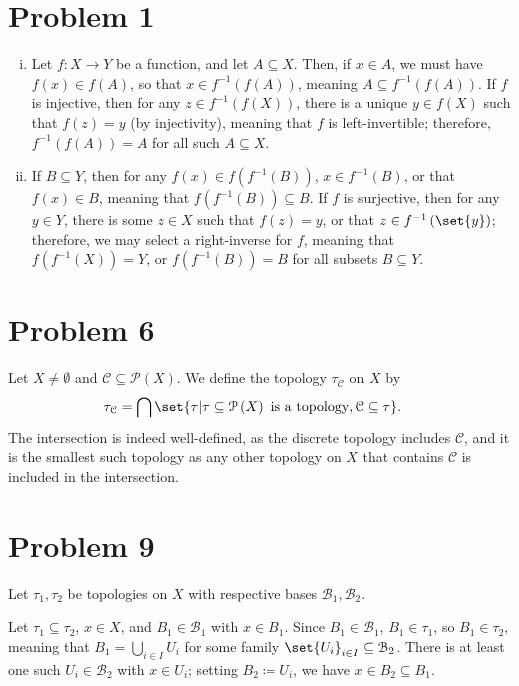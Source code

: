 \documentclass[10pt]{mypackage}
\begin{document}
\RaggedRight
\section{Problem 1}%
\begin{enumerate}[(i)]
  \item Let $f\colon X\rightarrow Y$ be a function, and let $A\subseteq X$. Then, if $x\in A$, we must have $f(x)\in f(A)$, so that $x\in f^{-1}\left( f\left( A \right) \right)$, meaning $A\subseteq f^{-1}\left( f(A) \right)$. If $f$ is injective, then for any $z\in f^{-1}\left( f\left( X \right) \right)$, there is a unique $y\in f(X)$ such that $f(z) = y$ (by injectivity), meaning that $f$ is left-invertible; therefore, $f^{-1}\left( f\left( A \right) \right) = A$ for all such $A\subseteq X$.
  \item If $B\subseteq Y$, then for any $f(x)\in f\left( f^{-1}\left( B \right) \right)$, $x\in f^{-1}\left( B \right)$, or that $f(x)\in B$, meaning that $f\left( f^{-1}\left( B \right) \right) \subseteq B$. If $f$ is surjective, then for any $y\in Y$, there is some $z\in X$ such that $f(z) = y$, or that $z\in f^{-1}\left( \set{y} \right)$; therefore, we may select a right-inverse for $f$, meaning that $f\left( f^{-1}\left( X \right) \right) = Y$, or $f\left( f^{-1}\left( B \right) \right) = B$ for all subsets $B\subseteq Y$.
\end{enumerate}
\section{Problem 6}%
Let $X\neq\emptyset$ and $\mathcal{C}\subseteq \mathcal{P}\left( X \right)$. We define the topology $\tau_{\mathcal{C}}$ on $X$ by
\begin{align*}
  \tau_{\mathcal{C}} &= \bigcap \set{\tau | \tau\subseteq \mathcal{P}\left( X \right)\text{ is a topology},\mathcal{C}\subseteq \tau}.
\end{align*}
The intersection is indeed well-defined, as the discrete topology includes $\mathcal{C}$, and it is the smallest such topology as any other topology on $X$ that contains $\mathcal{C}$ is included in the intersection.
\section{Problem 9}%
Let $\tau_1,\tau_2$ be topologies on $X$ with respective bases $\mathcal{B}_1,\mathcal{B}_2$.\newline

Let $\tau_1\subseteq \tau_2$, $x\in X$, and $B_1\in \mathcal{B}_1$ with $x\in B_1$. Since $B_1\in \mathcal{B}_1$, $B_1\in \tau_1$, so $B_1\in \tau_2$, meaning that $B_1 = \bigcup_{i\in I}U_i$ for some family $\set{U_i}_{i\in I}\subseteq \mathcal{B}_2$. There is at least one such $U_i\in \mathcal{B}_2$ with $x\in U_i$; setting $B_2\coloneq U_i$, we have $x\in B_2\subseteq B_1$.\newline
\end{document}
